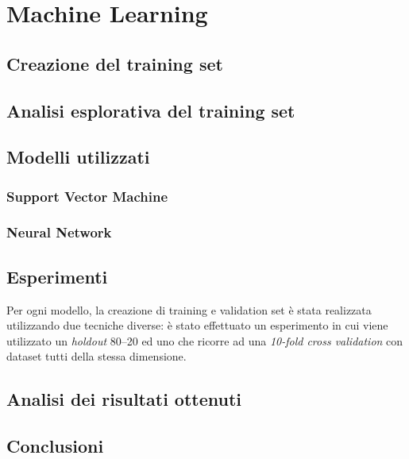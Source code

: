 \setcounter{chapter}{0}
\part{Machine Learning}
\chapter{Creazione del training set}

\chapter{Analisi esplorativa del training set}

\chapter{Modelli utilizzati}


\section{Support Vector Machine}

\section{Neural Network}

\chapter{Esperimenti}
Per ogni modello, la creazione di training e validation set è stata realizzata 
utilizzando due tecniche diverse: è stato effettuato un esperimento in cui 
viene utilizzato un \textit{holdout} 80--20 ed uno che ricorre ad una 
\textit{10-fold cross validation} con dataset tutti della stessa dimensione.



\chapter{Analisi dei risultati ottenuti}

\chapter{Conclusioni}
